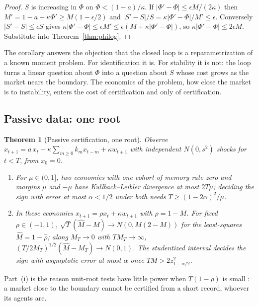 \documentclass[12pt]{article}
\newtheorem{theorem}{Theorem}
\theoremstyle{definition}
\theoremstyle{remark}
\begin{document}
\begin{proof}
$S$ is increasing in $\Phi$ on $\Phi<(1-a)/\kappa$. If $|\Phi'-\Phi|\le\epsilon M/(2\kappa)$ then $M'=1-a-\kappa\Phi'\ge M(1-\epsilon/2)$ and $|S'-S|/S=\kappa|\Phi'-\Phi|/M'\le\epsilon$. Conversely $|S'-S|\le\epsilon S$ gives $\kappa|\Phi'-\Phi|\le\epsilon M'\le\epsilon(M+\kappa|\Phi'-\Phi|)$, so $\kappa|\Phi'-\Phi|\le2\epsilon M$. Substitute into Theorem~\ref{thm:philog}.
\end{proof}

The corollary answers the objection that the closed loop is a reparametrization of a known moment problem. For identification it is. For stability it is not: the loop turns a linear question about $\Phi$ into a question about $S$ whose cost grows as the market nears the boundary. The economics of the problem, how close the market is to instability, enters the cost of certification and only of certification.

\subsection{Passive data: one root}

\begin{theorem}[Passive certification, one root]\label{thm:passive}
Observe $x_{t+1}=a\,x_t+\kappa\sum_{m\ge0}k_mx_{t-m}+\kappa w_{t+1}$ with independent $N(0,s^2)$ shocks for $t<T$, from $x_0=0$.
\begin{enumerate}[label=(\roman*)]
\item For $\mu\in(0,1]$, two economies with one cohort of memory rate zero and margins $\mu$ and $-\mu$ have Kullback--Leibler divergence at most $2T\mu$; deciding the sign with error at most $\alpha<1/2$ under both needs $T\ge(1-2\alpha)^2/\mu$.
\item In these economies $x_{t+1}=\rho x_t+\kappa w_{t+1}$ with $\rho=1-M$. For fixed $\rho\in(-1,1)$, $\sqrt T(\hat M-M)\to N(0,M(2-M))$ for the least-squares $\hat M=1-\hat\rho$; along $M_T\to0$ with $TM_T\to\infty$, $(T/2M_T)^{1/2}(\hat M-M_T)\to N(0,1)$. The studentized interval decides the sign with asymptotic error at most $\alpha$ once $TM>2z_{1-\alpha/2}^2$.
\end{enumerate}
\end{theorem}

Part~(i) is the reason unit-root tests have little power when $T(1-\rho)$ is small \citep{ers1996}: a market close to the boundary cannot be certified from a short record, whoever its agents are.
\end{document}
